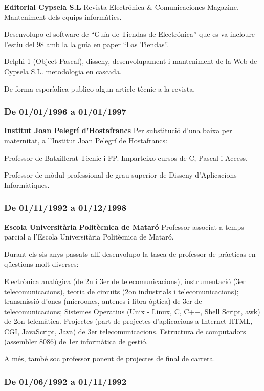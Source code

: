\documentclass[11pt]{article}
\begin{document}
\textbf{Editorial Cypsela S.L}
Revista Electrónica \& Comunicaciones Magazine. Manteniment dels equips informàtics.

Desenvolupo el software de “Guía de Tiendas de Electrónica” que es va incloure l’estiu del 98 amb la la guía en paper “Las Tiendas”. 

Delphi 1 (Object Pascal), disseny, desenvolupament i manteniment de la Web de Cypsela S.L. metodologia en cascada. 

De forma esporàdica publico algun article tècnic a la revista.
\subsubsection{De 01/01/1996 a 01/01/1997}
\label{sec-5-2-6}

\textbf{Institut Joan Pelegrí d’Hostafrancs}
Per substitució d’una baixa per maternitat, a l’Institut Joan Pelegrí de Hostafrancs:

Professor de Batxillerat Tècnic i FP. Imparteixo cursos de C, Pascal i Access.

Professor de mòdul professional de grau superior de Disseny d’Aplicacions Informàtiques.
\subsubsection{De 01/11/1992 a 01/12/1998}
\label{sec-5-2-7}

\textbf{Escola Universitària Politècnica de Mataró}
Professor associat a temps parcial a l’Escola Universitària Politècnica de Mataró. 

Durant els sis anys passats allí desenvolupo la tasca de professor de pràcticas en qüestions molt diverses: 

Electrònica analògica (de 2n i 3er de telecomunicacions), instrumentació (3er telecomunicacions), teoria de circuits (2on industrials i telecomunicacions); transmissió d’ones (microones, antenes i fibra òptica) de 3er de telecomunicacions; Sistemes Operatius (Unix - Linux, C, C++, Shell Script, awk) de 2on telemàtica. Projectes (part de projectes d’aplicacions a Internet HTML, CGI, JavaScript, Java) de 3er telecomunicacions. Estructura de computadors (assembler 8086) de 1er informàtica de gestió.

A més, també soc professor ponent de projectes de final de carrera.
\subsubsection{De 01/06/1992 a 01/11/1992}
\label{sec-5-2-8}
\end{document}

